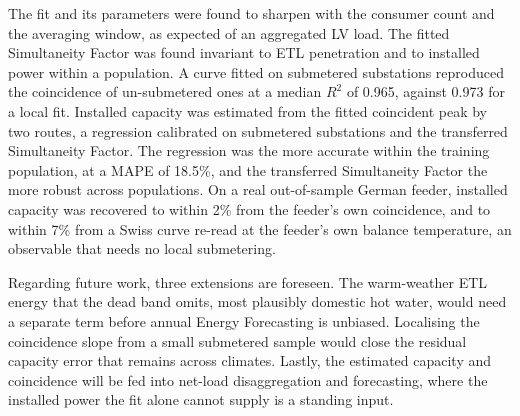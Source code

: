 \documentclass[9pt,journal,a4]{IEEEtran}
\begin{document}
The fit and its parameters were found to sharpen with the consumer count and the averaging window, as expected of an aggregated LV load. The fitted Simultaneity Factor was found invariant to ETL penetration and to installed power within a population. A curve fitted on submetered substations reproduced the coincidence of un-submetered ones at a median $R^2$ of 0.965, against 0.973 for a local fit. Installed capacity was estimated from the fitted coincident peak by two routes, a regression calibrated on submetered substations and the transferred Simultaneity Factor. The regression was the more accurate within the training population, at a MAPE of 18.5\%, and the transferred Simultaneity Factor the more robust across populations. On a real out-of-sample German feeder, installed capacity was recovered to within 2\% from the feeder's own coincidence, and to within 7\% from a Swiss curve re-read at the feeder's own balance temperature, an observable that needs no local submetering.

Regarding future work, three extensions are foreseen. The warm-weather ETL energy that the dead band omits, most plausibly domestic hot water, would need a separate term before annual Energy Forecasting is unbiased. Localising the coincidence slope from a small submetered sample would close the residual capacity error that remains across climates. Lastly, the estimated capacity and coincidence will be fed into net-load disaggregation and forecasting, where the installed power the fit alone cannot supply is a standing input.

% 
% 
\end{document}
